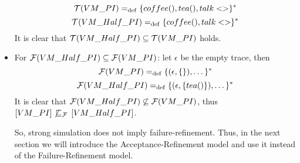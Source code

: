 \begin{prf}
\begin{itemize}
    \[\Traces[VM\_PI] \define \{coffee(),tea(),talk<>\}^\ast\]
    \[\Traces[VM\_Half\_PI] \define \{coffee(),talk<>\}^\ast\]
It is clear that $\Traces[VM\_Half\_PI]\subseteq\Traces[VM\_PI]$ holds. 

\item For $\Failures[VM\_Half\_PI]\subseteq\Failures[VM\_PI]$: let $\epsilon$ be the empty trace, then
    \[\Failures[VM\_PI] \define \{(\epsilon,\{\}),\dots\}^\ast\]
    \[\Failures[VM\_Half\_PI] \define \{(\epsilon,\{tea()\}),\dots\}^\ast\]
It is clear that $\Failures[VM\_Half\_PI]\not\subseteq\Failures[VM\_PI]$, thus $\ec{VM\_PI} \not\refiF \ec{VM\_Half\_PI}$.

So, strong simulation does not imply failure-refinement. Thus, in the next section we will introduce the Acceptance-Refinement model and use it instead of the Failure-Refinement model.
\end{itemize}
\end{prf}
